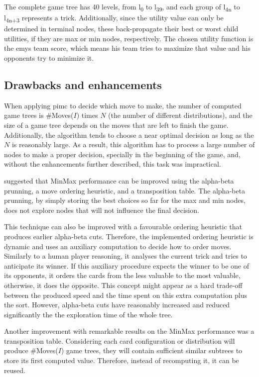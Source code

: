 The complete game tree has 40 levels, from l\textsubscript{0} to l\textsubscript{39}, and each group of l\textsubscript{4n} to l\textsubscript{4n+3} represents a trick.
Additionally, since the utility value can only be determined in terminal nodes, these back-propagate their best or worst child utilities, if they are max or min nodes, respectively.
The chosen utility function is the \ac{emys} team score, which means his team tries to maximize that value and his opponents try to minimize it.


\subsection{Drawbacks and enhancements}

When applying \ac{pimc} to decide which move to make, the number of computed game trees is \#Moves($I$) times $N$ (the number of different distributions), and the size of a game tree depends on the moves that are left to finish the game.
Additionally, the algorithm tends to choose a near optimal decision as long as the $N$ is reasonably large.
As a result, this algorithm has to process a large number of nodes to make a proper decision, specially in the beginning of the game, and, without the enhancements further described, this task was impractical.

\citet*{Russell2009} suggested that MinMax performance can be improved using the alpha-beta prunning, a move ordering heuristic, and a transposition table.
The alpha-beta prunning, by simply storing the best choices so far for the max and min nodes, does not explore nodes that will not influence the final decision.

This technique can also be improved with a favourable ordering heuristic that produces earlier alpha-beta cuts.
Therefore, the implemented ordering heuristic is dynamic and uses an auxiliary computation to decide how to order moves.
Similarly to a human player reasoning, it analyses the current trick and tries to anticipate its winner.
If this auxiliary procedure expects the winner to be one of its opponents, it orders the cards from the less valuable to the most valuable, otherwise, it does the opposite.
This concept might appear as a hard trade-off between the produced speed and the time spent on this extra computation plus the sort.
However, alpha-beta cuts have reasonably increased and reduced significantly the the exploration time of the whole tree.

Another improvement with remarkable results on the MinMax performance was a transposition table.
Considering each card configuration or distribution will produce \#Moves($I$) game trees, they will contain sufficient similar subtrees to store its first computed value.
Therefore, instead of recomputing it, it can be reused.

